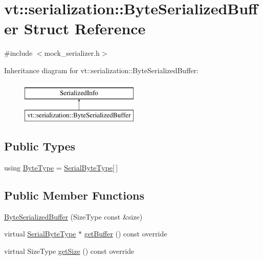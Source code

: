 \hypertarget{structvt_1_1serialization_1_1_byte_serialized_buffer}{}\section{vt\+:\+:serialization\+:\+:Byte\+Serialized\+Buffer Struct Reference}
\label{structvt_1_1serialization_1_1_byte_serialized_buffer}


{\ttfamily \#include $<$mock\+\_\+serializer.\+h$>$}

Inheritance diagram for vt\+:\+:serialization\+:\+:Byte\+Serialized\+Buffer\+:\begin{figure}[H]
\begin{center}
\leavevmode
\includegraphics[height=2.000000cm]{structvt_1_1serialization_1_1_byte_serialized_buffer}
\end{center}
\end{figure}
\subsection*{Public Types}
\begin{DoxyCompactItemize}
\item 
using \hyperlink{structvt_1_1serialization_1_1_byte_serialized_buffer_a26d694dbba219f7c127ab9fc65d840ef}{Byte\+Type} = \hyperlink{namespacevt_1_1serialization_a74f8d1a55940f9c38fc29522de66d926}{Serial\+Byte\+Type}\mbox{[}$\,$\mbox{]}
\end{DoxyCompactItemize}
\subsection*{Public Member Functions}
\begin{DoxyCompactItemize}
\item 
\hyperlink{structvt_1_1serialization_1_1_byte_serialized_buffer_acd835ccd045487a2aff8fc7a6a0bac8e}{Byte\+Serialized\+Buffer} (Size\+Type const \&size)
\item 
virtual \hyperlink{namespacevt_1_1serialization_a74f8d1a55940f9c38fc29522de66d926}{Serial\+Byte\+Type} $\ast$ \hyperlink{structvt_1_1serialization_1_1_byte_serialized_buffer_a3d2538f777f43a80670da3c38fbb4274}{get\+Buffer} () const override
\item 
virtual Size\+Type \hyperlink{structvt_1_1serialization_1_1_byte_serialized_buffer_a433e7f8720272818a6c0eed616c6e5af}{get\+Size} () const override
\end{DoxyCompactItemize}


